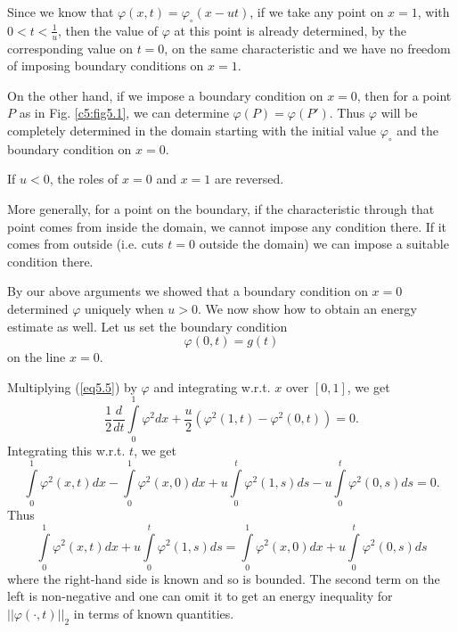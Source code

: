 Since we know that $\varphi (x,t) = \varphi_\circ (x-ut)$, if we take
any point on $x=1$, with $0< t < \frac{1}{u}$, then the value of
$\varphi$ at this point is already determined, by the corresponding
value on $t=0$, on the same characteristic and we have no freedom of
imposing boundary conditions on $x=1$. 

On the other hand, if we impose a boundary condition  on $x=0$, then
for a point $P$ as in Fig. \ref{c5:fig5.1}, we can determine $\varphi(P) = \varphi
(P')$. Thus $\varphi$ will be completely determined in the domain
starting with the initial value $\varphi_\circ$ and the boundary
condition on $x=0$. 

If $u<0$, the roles of $x =0$ and $x=1$ are reversed. 

More generally, for a point on the boundary, if the characteristic
through that point comes from inside the domain, we cannot impose any
condition there. If it comes from outside (i.e. cuts $t=0$ outside the
domain) we can impose a suitable condition there. 

By our above arguments we showed that a boundary condition on $x=0$
determined $\varphi$ uniquely when $u>0$. We now show how to obtain an
energy estimate as well. Let us set the boundary condition
\begin{equation*}
\varphi(0,t) = g(t) \tag{5.6}\label{eq5.6}
\end{equation*}\pageoriginale
on the line $x=0$.

Multiplying (\ref{eq5.5}) by $\varphi$ and integrating w.r.t. $x$ over
$[0,1]$, we get 
$$
\frac{1}{2} \frac{d}{dt} \int\limits^1_0 \varphi^2 dx + \frac{u}{2}
(\varphi^2 (1,t) - \varphi^2 (0,t)) =0. 
$$
Integrating this w.r.t. $t$, we get
$$
\int\limits^1_0 \varphi^2 (x,t) dx - \int\limits^1_0 \varphi^2 
(x,0) dx + u \int\limits^t_0 \varphi^2  (1,s) ds - u
\int\limits^t_0 \varphi^2 (0, s) ds =0.
$$
Thus
$$
\int\limits^1_0 \varphi^2 (x,t) dx + u \int\limits^t_0 \varphi^2 (1,s)
ds = \int\limits^1_0\varphi^2 (x,0) dx + u \int\limits^t_0
\varphi^2 (0, s) ds 
$$
where the right-hand side is known and so is bounded. The second term
on the left is non-negative and one can omit it to get an energy
inequality for $||\varphi (\cdot, t)||_2$ in terms of known
quantities. 

